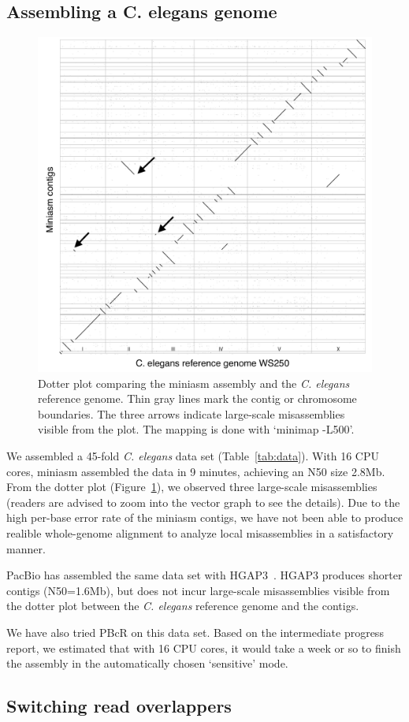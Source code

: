 \documentclass{bioinfo}
\begin{document}
\subsection{Assembling a C. elegans genome}

\begin{figure}[tb]
\includegraphics[width=.48\textwidth]{ce}
\caption{Dotter plot comparing the miniasm assembly and the {\it C. elegans}
reference genome. Thin gray lines mark the contig or chromosome boundaries. The
three arrows indicate large-scale misassemblies visible from the
plot. The mapping is done with `minimap -L500'.}\label{fig:ce}
\end{figure}

We assembled a 45-fold {\it C. elegans} data set (Table~\ref{tab:data}). With 16 CPU cores,
miniasm assembled the data in 9 minutes, achieving an N50 size 2.8Mb. From the
dotter plot (Figure~\ref{fig:ce}), we observed three large-scale misassemblies
(readers are advised to zoom into the vector graph to see the details).  Due to
the high per-base error rate of the miniasm contigs, we have not been able to
produce realible whole-genome alignment to analyze local misassemblies in a
satisfactory manner.

PacBio has assembled the same data set with HGAP3~\citep{Chin:2013qr}. HGAP3
produces shorter contigs (N50=1.6Mb), but does not incur large-scale
misassemblies visible from the dotter plot between the {\it C. elegans}
reference genome and the contigs.

We have also tried PBcR on this data set. Based on the intermediate progress
report, we estimated that with 16 CPU cores, it would take a week or so to
finish the assembly in the automatically chosen `sensitive' mode.

\subsection{Switching read overlappers}
\end{document}
